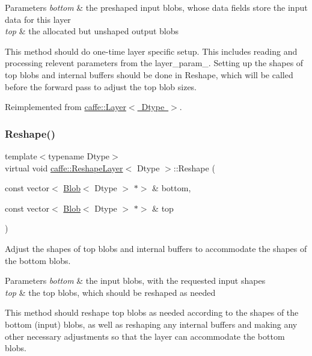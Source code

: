 \begin{DoxyParams}{Parameters}
{\em bottom} & the preshaped input blobs, whose data fields store the input data for this layer \\
\hline
{\em top} & the allocated but unshaped output blobs\\
\hline
\end{DoxyParams}
This method should do one-\/time layer specific setup. This includes reading and processing relevent parameters from the {\ttfamily layer\+\_\+param\+\_\+}. Setting up the shapes of top blobs and internal buffers should be done in {\ttfamily Reshape}, which will be called before the forward pass to adjust the top blob sizes. 

Reimplemented from \mbox{\hyperlink{classcaffe_1_1_layer_a481323a3e0972c682787f2137468c29f}{caffe\+::\+Layer$<$ Dtype $>$}}.

\mbox{\label{classcaffe_1_1_reshape_layer_ab071d750b8cef391e9fe0c67efaa4994}} 
\subsubsection{\texorpdfstring{Reshape()}{Reshape()}\hspace{0.1cm}{\footnotesize\ttfamily [1/2]}}
{\footnotesize\ttfamily template$<$typename Dtype$>$ \\
virtual void \mbox{\hyperlink{classcaffe_1_1_reshape_layer}{caffe\+::\+Reshape\+Layer}}$<$ Dtype $>$\+::Reshape (\begin{DoxyParamCaption}\item[{const vector$<$ \mbox{\hyperlink{classcaffe_1_1_blob}{Blob}}$<$ Dtype $>$ $\ast$$>$ \&}]{bottom,  }\item[{const vector$<$ \mbox{\hyperlink{classcaffe_1_1_blob}{Blob}}$<$ Dtype $>$ $\ast$$>$ \&}]{top }\end{DoxyParamCaption})\hspace{0.3cm}{\ttfamily [virtual]}}



Adjust the shapes of top blobs and internal buffers to accommodate the shapes of the bottom blobs. 


\begin{DoxyParams}{Parameters}
{\em bottom} & the input blobs, with the requested input shapes \\
\hline
{\em top} & the top blobs, which should be reshaped as needed\\
\hline
\end{DoxyParams}
This method should reshape top blobs as needed according to the shapes of the bottom (input) blobs, as well as reshaping any internal buffers and making any other necessary adjustments so that the layer can accommodate the bottom blobs. 

